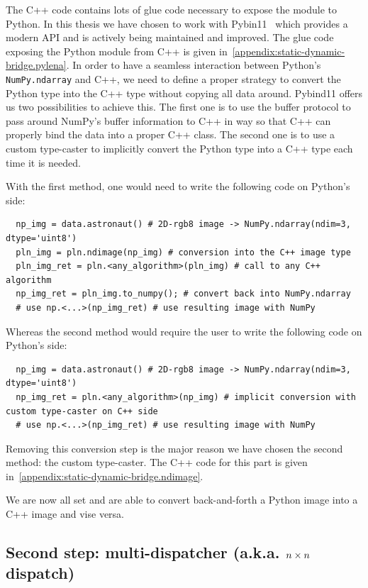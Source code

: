 The C++ code contains lots of glue code necessary to expose the module to Python. In this thesis we have chosen to work
with Pybin11~\parencite{jakob.2017.pybind11} which provides a modern API and is actively being maintained and improved.
The glue code exposing the Python module from C++ is given in~\cref{appendix:static-dynamic-bridge.pylena}. In order to
have a seamless interaction between Python's \texttt{NumPy.ndarray} and C++, we need to define a proper strategy to
convert the Python type into the C++ type without copying all data around. Pybind11 offers us two possibilities to achieve
this. The first one is to use the buffer protocol to pass around NumPy's buffer information to C++ in way so that C++
can properly bind the data into a proper C++ class. The second one is to use a custom type-caster to implicitly convert
the Python type into a C++ type each time it is needed.

With the first method, one would need to write the following code on Python's side:
\begin{verbatim}
  np_img = data.astronaut() # 2D-rgb8 image -> NumPy.ndarray(ndim=3, dtype='uint8')
  pln_img = pln.ndimage(np_img) # conversion into the C++ image type
  pln_img_ret = pln.<any_algorithm>(pln_img) # call to any C++ algorithm
  np_img_ret = pln_img.to_numpy(); # convert back into NumPy.ndarray
  # use np.<...>(np_img_ret) # use resulting image with NumPy
\end{verbatim}
Whereas the second method would require the user to write the following code on Python's side:
\begin{verbatim}
  np_img = data.astronaut() # 2D-rgb8 image -> NumPy.ndarray(ndim=3, dtype='uint8')
  np_img_ret = pln.<any_algorithm>(np_img) # implicit conversion with custom type-caster on C++ side
  # use np.<...>(np_img_ret) # use resulting image with NumPy
\end{verbatim}
Removing this conversion step is the major reason we have chosen the second method: the custom type-caster. The C++ code
for this part is given in~\cref{appendix:static-dynamic-bridge.ndimage}.

We are now all set and are able to convert back-and-forth a Python image into a C++ image and vise versa.

\subsection{Second step: multi-dispatcher (a.k.a. \(\protect n \times n\) dispatch)}

